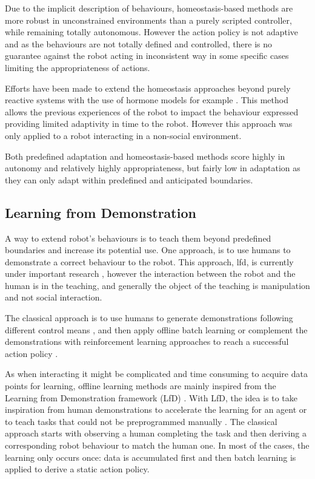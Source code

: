 	Due to the implicit description of behaviours, homeostasis-based methods are more robust in unconstrained environments than a purely scripted controller, while remaining totally autonomous. However the action policy is not adaptive and as the behaviours are not totally defined and controlled, there is no guarantee against the robot acting in inconsistent way in some specific cases limiting the appropriateness of actions.

	Efforts have been made to extend the homeostasis approaches beyond purely reactive systems with the use of hormone models for example \citep{Lones2014}. This method allows the previous experiences of the robot to impact the behaviour expressed providing limited adaptivity in time to the robot. However this approach was only applied to a robot interacting in a non-social environment.
	
	Both predefined adaptation and homeostasis-based methods score highly in autonomy and relatively highly appropriateness, but fairly low in adaptation as they can only adapt within predefined and anticipated boundaries.

\subsection{Learning from Demonstration} \label{ssec:back_lfd}

	A way to extend robot's behaviours is to teach them beyond predefined boundaries and increase its potential use. One approach, is to use humans to demonstrate a correct behaviour to the robot. This approach, \acrfull{lfd}, is currently under important research \citep{argall2009survey,billard2008robot}, however the interaction between the robot and the human is in the teaching, and generally the object of the teaching is manipulation and not social interaction.
	
	The classical approach is to use humans to generate demonstrations following different control means \citep{argall2009survey}, and then apply offline batch learning or complement the demonstrations with reinforcement learning approaches to reach a successful action policy \citep{billard2008robot}.


    As when interacting it might be complicated and time consuming to acquire data points for learning, offline learning methods are mainly inspired from the Learning from Demonstration framework (LfD) \citep{argall2009survey}. With LfD, the idea is to take inspiration from human demonstrations to accelerate the learning for an agent or to teach tasks that could not be preprogrammed manually \citep{billard2013robot}. The classical approach starts with observing a human completing the task and then deriving a corresponding robot behaviour to match the human one. In most of the cases, the learning only occurs once: data is accumulated first and then batch learning is applied to derive a static action policy. 
    
